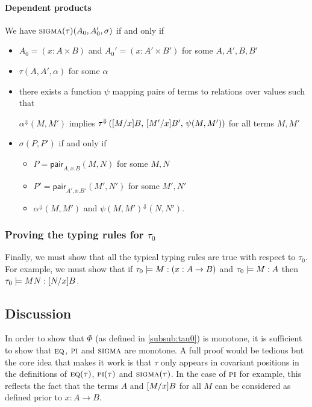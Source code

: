\documentclass{article} \usepackage{chtt-notes} \usepackage{stmaryrd}
\newcommand{\lift}[1]{{#1}^{\Downarrow}}
\begin{document}
\paragraph{Dependent products}
We have $\textsc{sigma}(\tau)(A_0, A'_0, \sigma)$ if and only if
\begin{itemize}
\item $A_0 = (x:A \times B)$ and $A_0' = (x:A' \times B')$ for some
  $A,A',B,B'$
\item $\tau(A, A', \alpha)$ for some $\alpha$
\item there exists a function $\psi$ mapping pairs of terms to
  relations over values such that
  \begin{center}
    $\lift{\alpha}(M, M')$ implies
    $\lift{\tau}\left(\subst{M}{x}{B}, \, \subst{M'}{x}{B'}, \,
      \psi(M,M')\right)$ for all terms $M, M'$
  \end{center}
\item $\sigma(P, P')$ if and only if
  \begin{itemize}
  \item $P = \textsf{pair}_{A, x.B}(M,N)$ for some $M, N$
  \item $P' = \textsf{pair}_{A', x.B'}(M',N')$ for some $M', N'$
  \item $\lift{\alpha}(M, M')$ and $\lift{\psi(M, M')}(N, N')$.
  \end{itemize}
\end{itemize}

\subsubsection{Proving the typing rules for $\tau_0$}

Finally, we must show that all the typical typing rules are true with
respect to $\tau_0$. For example, we must show that if
$\tau_0 \models \hasEF{M}{(x:A \to B)}$ and
$\tau_0 \models \hasEF{M}{A}$ then
$\tau_0 \models \hasEF{MN}{\subst{N}{x}{B}}$.


\subsection{Discussion}

In order to show that $\Phi$ (as defined in \ref{subsub:tau0}) is
monotone, it is sufficient to show that $\textsc{eq}$, $\textsc{pi}$
and $\textsc{sigma}$ are monotone. A full proof would be tedious but
the core idea that makes it work is that $\tau$ only appears in
covariant positions in the definitions of $\textsc{eq}(\tau)$,
$\textsc{pi}(\tau)$ and $\textsc{sigma}(\tau)$.  In the case of
$\textsc{pi}$ for example, this reflects the fact that the terms $A$
and $[M/x]B$ for all $M$ can be considered as defined prior
to $x:A \to B$.
\end{document}
